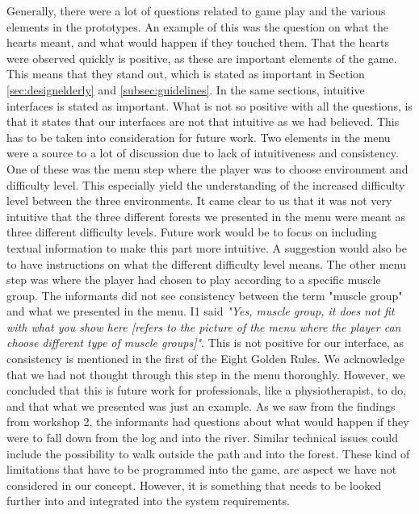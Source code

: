 Generally, there were a lot of questions related to game play and the various elements in the prototypes. An example of this was the question on what the hearts meant, and what would happen if they touched them. That the hearts were observed quickly is positive, as these are important elements of the game. This means that they stand out, which is stated as important in Section \ref{sec:designelderly} and \ref{subsec:guidelines}. In the same sections, intuitive interfaces is stated as important. What is not so positive with all the questions, is that it states that our interfaces are not that intuitive as we had believed. This has to be taken into consideration for future work. Two elements in the menu were a source to a lot of discussion due to lack of intuitiveness and consistency. One of these was the menu step where the player was to choose environment and difficulty level. This especially yield the understanding of the increased difficulty level between the three environments. It came clear to us that it was not very intuitive that the three different forests we presented in the menu were meant as three different difficulty levels. Future work would be to focus on including textual information to make this part more intuitive. A suggestion would also be to have instructions on what the different difficulty level means. The other menu step was where the player had chosen to play according to a specific muscle group. The informants did not see consistency between the term "muscle group" and what we presented in the menu. I1 said \emph{"Yes, muscle group, it does not fit with what you show here [refers to the picture of the menu where the player can choose different type of muscle groups]"}. This is not positive for our interface, as consistency is mentioned in the first of the Eight Golden Rules. We acknowledge that we had not thought through this step in the menu thoroughly. However, we concluded that this is future work for professionals, like a physiotherapist, to do, and that what we presented was just an example. As we saw from the findings from workshop 2, the informants had questions about what would happen if they were to fall down from the log and into the river. Similar technical issues could include the possibility to walk outside the path and into the forest. These kind of limitations that have to be programmed into the game, are aspect we have not considered in our concept. However, it is something that needs to be looked further into and integrated into the system requirements.   

